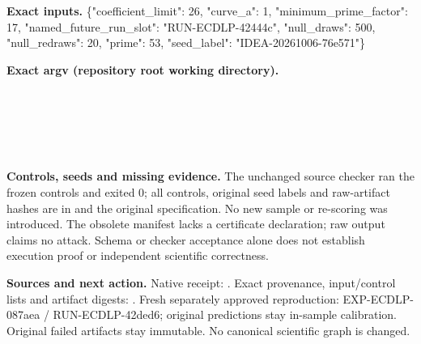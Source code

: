 \documentclass[10pt]{article}
\begin{document}
\textbf{Exact inputs.} \{"coefficient\_limit": 26, "curve\_a": 1, "minimum\_prime\_factor": 17, "named\_future\_run\_slot": "RUN-ECDLP-42444c", "null\_draws": 500, "null\_redraws": 20, "prime": 53, "seed\_label": "IDEA-20261006-76e571"\}

\textbf{Exact argv (repository root working directory).}\\
{\footnotesize {}\\
\\
\\
\\
\\
}

\textbf{Controls, seeds and missing evidence.} The unchanged source checker ran the frozen controls and exited 0; all controls, original seed labels and raw-artifact hashes are in  and the original specification. No new sample or re-scoring was introduced. The obsolete manifest lacks a certificate declaration; raw output claims no attack. Schema or checker acceptance alone does not establish execution proof or independent scientific correctness.

\textbf{Sources and next action.} Native receipt: . Exact provenance, input/control lists and artifact digests: . Fresh separately approved reproduction: EXP-ECDLP-087aea / RUN-ECDLP-42ded6; original predictions stay in-sample calibration. Original failed artifacts stay immutable. No canonical scientific graph is changed.
\end{document}
